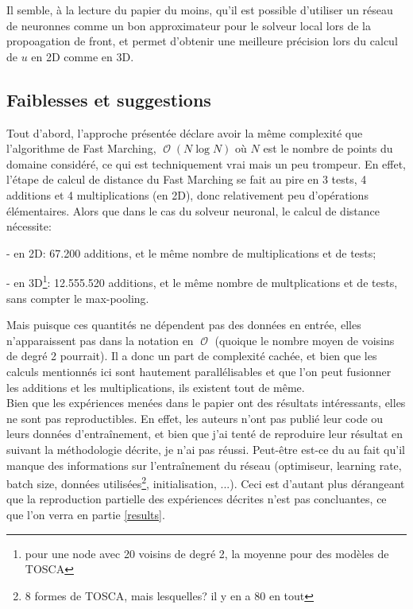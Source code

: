 \documentclass[11pt]{article} %
\DeclareMathOperator\Oo{\mathcal{O}}
\begin{document}
Il semble, à la lecture du papier du moins, qu'il est possible d'utiliser un réseau de neuronnes comme un bon approximateur pour le solveur local lors de la propoagation de front, et permet d'obtenir une meilleure précision lors du calcul de $u$ en 2D comme en 3D.

\subsection{Faiblesses et suggestions}\label{complexity}

Tout d'abord, l'approche présentée déclare avoir la même complexité que l'algorithme de Fast Marching, $\Oo(N \log N)$ où $N$ est le nombre de points du domaine considéré, ce qui est techniquement vrai mais un peu trompeur. En effet, l'étape de calcul de distance du Fast Marching se fait au pire en 3 tests, 4 additions et 4 multiplications (en 2D), donc relativement peu d'opérations élémentaires. Alors que dans le cas du solveur neuronal, le calcul de distance nécessite:

- en 2D: 67.200 additions, et le même nombre de multiplications et de tests;

- en 3D\footnote{pour une node avec 20 voisins de degré 2, la moyenne pour des modèles de TOSCA}: 12.555.520 additions, et le même nombre de multplications et de tests, sans compter le max-pooling.

Mais puisque ces quantités ne dépendent pas des données en entrée, elles n'apparaissent pas dans la notation en $\Oo$ (quoique le nombre moyen de voisins de degré 2 pourrait). Il a donc un part de complexité cachée, et bien que les calculs mentionnés ici sont hautement parallélisables et que l'on peut fusionner les additions et les multiplications, ils existent tout de même. \\

Bien que les expériences menées dans le papier ont des résultats intéressants, elles ne sont pas reproductibles. En effet, les auteurs n'ont pas publié leur code ou leurs données d'entraînement, et bien que j'ai tenté de reproduire leur résultat en suivant la méthodologie décrite, je n'ai pas réussi. Peut-être est-ce du au fait qu'il manque des informations sur l'entraînement du réseau (optimiseur, learning rate, batch size, données utilisées\footnote{8 formes de TOSCA, mais lesquelles? il y en a 80 en tout}, initialisation, ...). Ceci est d'autant plus dérangeant que la reproduction partielle des expériences décrites n'est pas concluantes, ce que l'on verra en partie \ref{results}.\\
\end{document}
